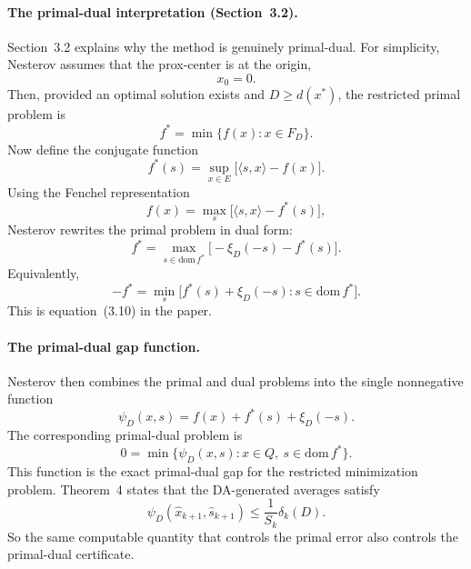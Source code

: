 \documentclass[12pt,a4paper]{article}
\begin{document}
\paragraph{The primal-dual interpretation (Section~3.2).}
Section~3.2 explains why the method is genuinely primal-dual. For simplicity, Nesterov assumes that the prox-center is at the origin,
\begin{equation}
    x_0 = 0.
\end{equation}
Then, provided an optimal solution exists and $D \ge d(x^*)$, the restricted primal problem is
\begin{equation}
    f^* = \min\{ f(x) : x \in F_D \}.
\end{equation}
Now define the conjugate function
\begin{equation}
    f^*(s) = \sup_{x \in E} \bigl[ \langle s,x \rangle - f(x) \bigr].
\end{equation}
Using the Fenchel representation
\begin{equation}
    f(x) = \max_s \bigl[ \langle s,x \rangle - f^*(s) \bigr],
\end{equation}
Nesterov rewrites the primal problem in dual form:
\begin{equation}
    f^* = \max_{s \in \mathrm{dom}\,f^*} \bigl[-\xi_D(-s) - f^*(s)\bigr].
\end{equation}
Equivalently,
\begin{equation}
    -f^* = \min_s \bigl[ f^*(s) + \xi_D(-s) : s \in \mathrm{dom}\,f^* \bigr].
\end{equation}
This is equation~(3.10) in the paper.

\paragraph{The primal-dual gap function.}
Nesterov then combines the primal and dual problems into the single nonnegative function
\begin{equation}
    \psi_D(x,s) = f(x) + f^*(s) + \xi_D(-s).
\end{equation}
The corresponding primal-dual problem is
\begin{equation}
    0 = \min\{ \psi_D(x,s) : x \in Q,\ s \in \mathrm{dom}\,f^* \}.
\end{equation}
This function is the exact primal-dual gap for the restricted minimization problem. Theorem~4 states that the DA-generated averages satisfy
\begin{equation}
    \psi_D(\hat{x}_{k+1}, \hat{s}_{k+1}) \le \frac{1}{S_k}\delta_k(D).
    \label{eq:primal-dual-gap}
\end{equation}
So the same computable quantity that controls the primal error also controls the primal-dual certificate.
\end{document}
